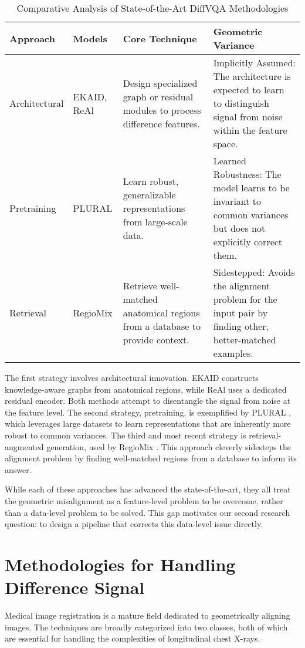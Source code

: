 \begin{table}[h!]
	\centering
	\caption{Comparative Analysis of State-of-the-Art DiffVQA Methodologies}
	\label{tab:diffvqa_comparison}
	\begin{tabular}{|l|l|p{5cm}|p{6cm}|}
		\hline
		\textbf{Approach} & \textbf{Models} & \textbf{Core Technique} & \textbf{Geometric Variance} \\ \hline \hline
		Architectural & EKAID, ReAl & Design specialized graph or residual modules to process difference features. & Implicitly Assumed: The architecture is expected to learn to distinguish signal from noise within the feature space. \\ \hline
		Pretraining & PLURAL & Learn robust, generalizable representations from large-scale data. & Learned Robustness: The model learns to be invariant to common variances but does not explicitly correct them. \\ \hline
		Retrieval & RegioMix & Retrieve well-matched anatomical regions from a database to provide context. & Sidestepped: Avoids the alignment problem for the input pair by finding other, better-matched examples. \\ \hline
	\end{tabular}
\end{table}

The first strategy involves architectural innovation. EKAID \cite{ekaid} constructs knowledge-aware graphs from anatomical regions, while ReAl \cite{real} uses a dedicated residual encoder. Both methods attempt to disentangle the signal from noise at the feature level. The second strategy, pretraining, is exemplified by PLURAL \cite{plural}, which leverages large datasets to learn representations that are inherently more robust to common variances. The third and most recent strategy is retrieval-augmented generation, used by RegioMix \cite{regiomix}. This approach cleverly sidesteps the alignment problem by finding well-matched regions from a database to inform its answer.

While each of these approaches has advanced the state-of-the-art, they all treat the geometric misalignment as a feature-level problem to be overcome, rather than a data-level problem to be solved. This gap motivates our second research question: to design a pipeline that corrects this data-level issue directly.

\section{Methodologies for Handling Difference Signal}
Medical image registration is a mature field dedicated to geometrically aligning images. The techniques are broadly categorized into two classes, both of which are essential for handling the complexities of longitudinal chest X-rays.

